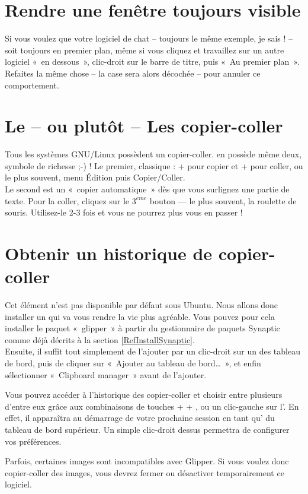 \section{Rendre une fenêtre toujours visible}
Si vous voulez que votre logiciel de chat -- toujours le même exemple, je sais ! -- soit toujours en premier plan, même si vous cliquez et travaillez sur un autre logiciel «~en dessous~», clic-droit sur le barre de titre, puis «~Au premier plan~». Refaites la même chose -- la case sera alors décochée -- pour annuler ce comportement.
\section{Le -- ou plutôt -- Les copier-coller}
Tous les systèmes GNU/Linux possèdent un copier-coller.  en possède même deux, symbole de richesse ;-) ! Le premier, classique :  +  pour copier et  +  pour coller, ou le plus souvent, menu Édition puis Copier/Coller.\\
Le second est un «~copier automatique~» dès que vous surlignez une partie de texte. Pour la coller, cliquez sur le $3^{eme}$ bouton --- le plus souvent, la roulette de souris. Utilisez-le 2-3 fois et vous ne pourrez plus vous en passer !
\section{Obtenir un historique de copier-coller}
Cet élément n'est pas disponible par défaut sous Ubuntu. Nous allons donc installer un  qui va vous rendre la vie plus agréable. Vous pouvez pour cela installer le paquet «~glipper~» à partir du gestionnaire de paquets Synaptic comme déjà décrits à la section \ref{RefInstallSynaptic}.\\
Ensuite, il suffit tout simplement de l'ajouter par un clic-droit sur un des tableau de bord, puis de cliquer sur «~Ajouter au tableau de bord\ldots{}~», et enfin sélectionner «~Clipboard manager~» avant de l'ajouter.\par
Vous pouvez accéder à l'historique des copier-coller et choisir entre plusieurs d'entre eux grâce aux combinaisons de touches  +  + , ou un clic-gauche sur l'. En effet, il apparaîtra au démarrage de votre prochaine session en tant qu' du tableau de bord supérieur. Un simple clic-droit dessus permettra de configurer vos préférences.
\begin{nota}
Parfois, certaines images sont incompatibles avec Glipper. Si vous voulez donc copier-coller des images, vous devrez fermer ou désactiver temporairement ce logiciel.
\end{nota}
